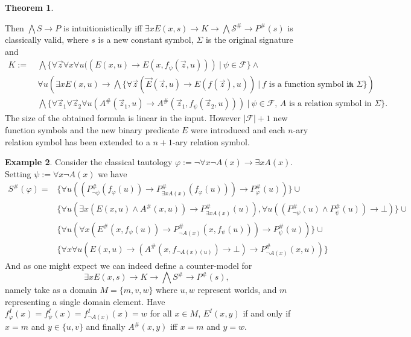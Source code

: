 \documentclass[a4paper,11pt]{report}
\theoremstyle{definition}
\newtheorem{theorem}{Theorem}[section]
\theoremstyle{definition}
\theoremstyle{definition}
\theoremstyle{definition}
\theoremstyle{definition}
\theoremstyle{definition}
\newtheorem{example}[theorem]{Example}
\theoremstyle{definition}
\begin{document}
\begin{theorem}
\begin{itemize}
		\end{itemize}
		Then $\bigwedge S\to P$ is intuitionistically iff $\exists xE(x, s)\to K\to \bigwedge\mathcal S^\#\to P^\#(s)$ is classically valid, where $s$ is a new constant symbol, $\Sigma$ is the original signature and
		\begin{align*}
			K := &\:\bigwedge\{\forall\vec z\forall x\forall u((E(x, u)\to E(x, f_\psi(\vec z, u)))\:|\:\psi\in\mathcal F\}\wedge\\
			&\:\forall u\left(\exists xE(x, u)\to \bigwedge\{\forall\vec z(\vec E(\vec z, u)\to E(f(\vec z), u))\:|\:\text{$f$ is a function symbol in $\Sigma$}\}\right)\wedge\\
			&\:\bigwedge\{\forall\vec z_1\forall \vec z_2\forall u(A^\#(\vec z_1, u)\to A^\#(\vec z_1, f_\psi(\vec z_2, u)))\:|\:\text{$\psi\in\mathcal F$, $A$ is a relation symbol in $\Sigma$}\}.
		\end{align*}
		The size of the obtained formula is linear in the input. However $|\mathcal F| + 1$ new function symbols and the new binary predicate $E$ were introduced and each $n$-ary relation symbol has been extended to a $n+1$-ary relation symbol.
	\end{theorem}
	
		
	\begin{example}
		Consider the classical tautology $\varphi := \neg\forall x\neg A(x)\to \exists x A(x)$. Setting $\psi := \forall x\neg A(x)$ we have
		\begin{align*}
			S^\#(\varphi) = &\{\forall u((P_{\neg\psi}^\#(f_\varphi(u))\to P_{\exists xA(x)}^\#(f_\varphi(u)))\to P_\varphi^\#(u))\}\cup\\
			 & \{\forall u(\exists x(E(x, u)\wedge A^\#(x, u))\to P_{\exists xA(x)}^\#(u)), \forall u((P_{\neg\psi}^\#(u)\wedge P^\#_\psi(u))\to \bot)\}\cup\\
			 & \{\forall u(\forall x(E^\#(x,f_\psi(u))\to P^\#_{\neg A(x)}(x, f_\psi(u)))\to P^\#_\psi(u))\}\cup\\&\{ \forall x\forall u(E(x, u)\to (A^\#(x, f_{\neg A(x)(u)})\to \bot)\to P^\#_{\neg A(x)}(x, u))\}
		\end{align*}
		And as one might expect we can indeed define a counter-model for $$\exists xE(x, s)\to K\to\bigwedge S^\#\to P^\#(s),$$
		namely take as a domain $M = \{m, v, w\}$ where $u, w$ represent worlds, and $m$ representing a single domain element. Have $f_\varphi^I(x) = f_\psi^I(x) = f_{\neg A(x)}^I(x) = w$ for all $x\in M$, $E^I(x, y)$ if and only if $x = m$ and $y\in\{u, v\}$ and finally $A^\#(x, y)$ iff $x = m$ and $y = w$.
	\end{example}
	
\end{document}
